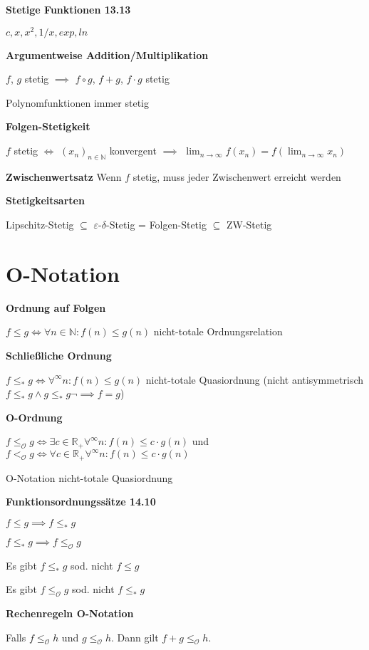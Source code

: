 \documentclass[a4paper,10pt]{article}
\newcommand{\N}{\mathbb{N}}
\newcommand{\natnum}{\mathbb{N}}
\newcommand{\realnum}{\mathbb{R}}
\newcommand{\lt}{<}
\renewcommand{\epsilon}{\varepsilon}
\newcommand{\bigOSymbol}{\mathcal{O}}
\begin{document}
\begin{multicols}{3}
\textbf{Stetige Funktionen 13.13}

$c, x, x^2, 1/x, exp, ln$

\textbf{Argumentweise Addition/Multiplikation}

$f$, $g$ stetig $\implies$ $f \circ g$, $f+g$, $f\cdot g$ stetig

Polynomfunktionen immer stetig

\textbf{Folgen-Stetigkeit}

$f$ stetig $\iff$ $(x_n)_{n\in\N}$ konvergent $\implies$ $\lim_{n \rightarrow \infty} f(x_n) = f\left(\lim_{n \rightarrow \infty} x_n \right)$

\textbf{Zwischenwertsatz} Wenn $f$ stetig, muss jeder Zwischenwert erreicht werden

\textbf{Stetigkeitsarten}

Lipschitz-Stetig $\subseteq$ $\epsilon$-$\delta$-Stetig = Folgen-Stetig $\subseteq$ ZW-Stetig 

\section{O-Notation}

\textbf{Ordnung auf Folgen}

$f \leq g \Leftrightarrow \forall n \in \natnum: f(n) \leq g(n)$ nicht-totale Ordnungsrelation

\textbf{Schließliche Ordnung}

$f \leq_* g \Leftrightarrow \forall^\infty n: f(n) \leq g(n)$ nicht-totale Quasiordnung (nicht antisymmetrisch $f\leq_* g \land g \leq_* g \neg\implies f=g$)

\textbf{O-Ordnung}

$f \leq_{\bigOSymbol} g \Leftrightarrow \exists c \in \realnum_+ \forall^\infty n: f(n) \leq c \cdot g(n)$ und $f \lt_{\bigOSymbol} g \Leftrightarrow \forall c \in \realnum_+ \forall^\infty n: f(n) \leq c \cdot g(n)$

O-Notation nicht-totale Quasiordnung

\textbf{Funktionsordnungssätze 14.10}

$f \leq g \implies f \leq_* g$

$f \leq_* g \implies f \leq_{\bigOSymbol} g$

Es gibt $f \leq_* g$ sod. nicht $f \leq g$

Es gibt $f \leq_{\bigOSymbol} g$ sod. nicht $f \leq_* g$

\textbf{Rechenregeln O-Notation}

Falls $f \leq_{\bigOSymbol} h$ und $g \leq_{\bigOSymbol} h$. Dann gilt $f+g \leq_{\bigOSymbol} h$.


\end{multicols}
\end{document}
